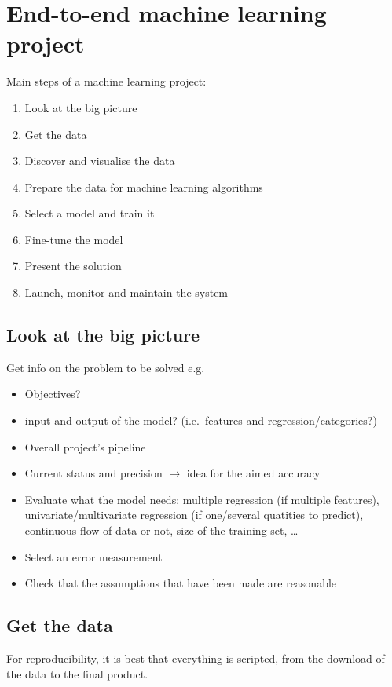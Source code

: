 \newpage
\section{End-to-end machine learning project}

Main steps of a machine learning project:
\begin{enumerate}
    \item Look at the big picture
    \item Get the data
    \item Discover and visualise the data
    \item Prepare the data for machine learning algorithms
    \item Select a model and train it
    \item Fine-tune the model
    \item Present the solution
    \item Launch, monitor and maintain the system
\end{enumerate}

\subsection{Look at the big picture}
Get info on the problem to be solved e.g.\
\begin{itemize}
    \item Objectives?
    \item input and output of the model? (i.e.\ features and regression/categories?)
    \item Overall project's pipeline
    \item Current status and precision $\rightarrow$ idea for the aimed accuracy
    \item Evaluate what the model needs: multiple regression (if multiple features), univariate/multivariate regression (if one/several quatities to predict), continuous flow of data or not, size of the training set, \ldots
    \item Select an error measurement
    \item Check that the assumptions that have been made are reasonable
\end{itemize}

\subsection{Get the data}
For reproducibility, it is best that everything is scripted, from the download of the data to the final product.

